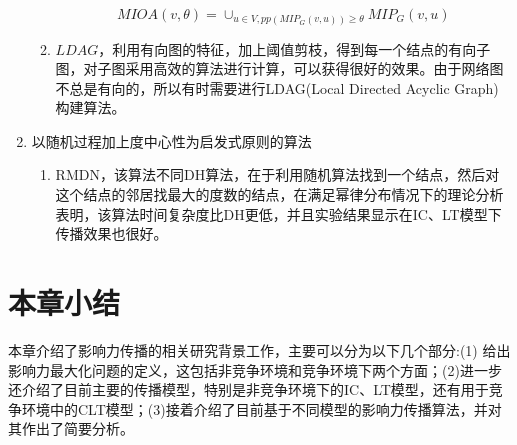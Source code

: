 \begin{enumerate}
\begin{enumerate}
\begin{displaymath}
\end{displaymath}
\begin{displaymath}
MIOA(v, \theta)=\cup_{u \in V,pp(MIP_{G}(v, u)) \geq \theta}MIP_{G}(v,u)
\end{displaymath}
\item $LDAG$\cite{chen2010scalableICDM}，利用有向图的特征，加上阈值剪枝，得到每一个结点的有向子图，对子图采用高效的算法进行计算，可以获得很好的效果。由于网络图不总是有向的，所以有时需要进行LDAG(Local Directed Acyclic Graph)构建算法。
\end{enumerate}
\item 以随机过程加上度中心性为启发式原则的算法
\begin{enumerate}
\item RMDN\cite{hu2015rmdn}，该算法不同DH算法，在于利用随机算法找到一个结点，然后对这个结点的邻居找最大的度数的结点，在满足幂律分布情况下的理论分析表明，该算法时间复杂度比DH更低，并且实验结果显示在IC、LT模型下传播效果也很好。
\end{enumerate}
\end{enumerate}


\section{本章小结}
本章介绍了影响力传播的相关研究背景工作，主要可以分为以下几个部分:(1) 给出影响力最大化问题的定义，这包括非竞争环境和竞争环境下两个方面；(2)进一步还介绍了目前主要的传播模型，特别是非竞争环境下的IC、LT模型，还有用于竞争环境中的CLT模型；(3)接着介绍了目前基于不同模型的影响力传播算法，并对其作出了简要分析。
